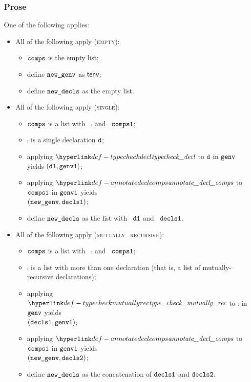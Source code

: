 \subsubsection{Prose}
One of the following applies:
\begin{itemize}
  \item All of the following apply (\textsc{empty}):
  \begin{itemize}
    \item $\texttt{comps}$ is the empty list;
    \item define $\texttt{new\_genv}$ as $\textsf{tenv}$;
    \item define $\texttt{new\_decls}$ as the empty list.
  \end{itemize}

  \item All of the following apply (\textsc{single}):
  \begin{itemize}
    \item $\texttt{comps}$ is a list with \head\ $\comp$ and \tail\ $\texttt{comps1}$;
    \item $\comp$ is a single declaration $\texttt{d}$;
    \item applying $\typecheckdecl$ to $\texttt{d}$ in $\texttt{genv}$ yields $(\texttt{d1}, \texttt{genv1})$\ProseOrTypeError;
    \item applying $\annotatedeclcomps$ to $\texttt{comps1}$ in $\texttt{genv1}$ yields \\ $(\texttt{new\_genv}, \texttt{decls1})$\ProseOrTypeError;
    \item define $\texttt{new\_decls}$ as the list with \head\ $\texttt{d1}$ and \tail\ $\texttt{decls1}$.
  \end{itemize}

  \item All of the following apply (\textsc{mutually\_recursive}):
  \begin{itemize}
    \item $\texttt{comps}$ is a list with \head\ $\comp$ and \tail\ $\texttt{comps1}$;
    \item $\comp$ is a list with more than one declaration (that is, a list of mutually-recursive declarations);
    \item applying $\typecheckmutuallyrec$ to $\comp$ in $\texttt{genv}$ yields \\ $(\texttt{decls1}, \texttt{genv1})$\ProseOrTypeError;
    \item applying $\annotatedeclcomps$ to $\texttt{comps1}$ in $\texttt{genv1}$ yields \\ $(\texttt{new\_genv}, \texttt{decls2})$\ProseOrTypeError;
    \item define $\texttt{new\_decls}$ as the concatenation of $\texttt{decls1}$ and $\texttt{decls2}$.
  \end{itemize}
\end{itemize}

